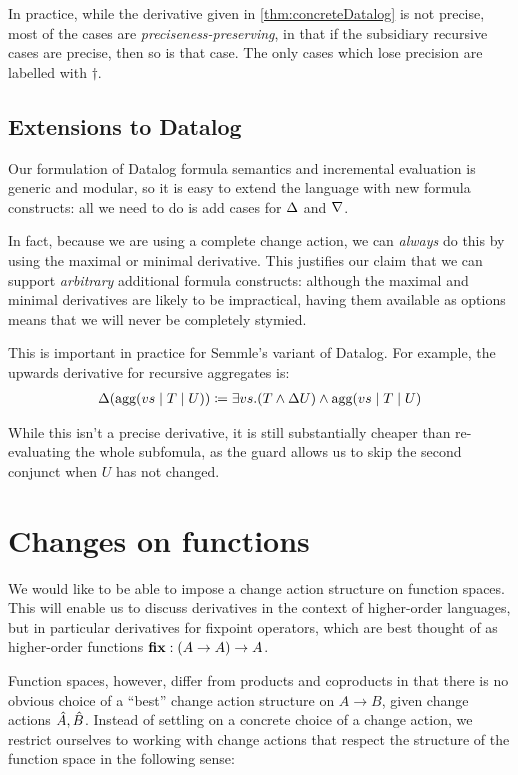 In practice, while the derivative given in \cref{thm:concreteDatalog} is not
precise, most of the cases are \emph{preciseness-preserving}, in that if the
subsidiary recursive cases are precise, then so is that case. The only cases
which lose precision are labelled with $\dagger$.

\subsection{Extensions to Datalog}
\label{sec:extensions}

Our formulation of Datalog formula semantics and incremental evaluation is 
generic and modular, so it is easy to extend the language with new
formula constructs: all we need to do is add cases for $\Delta$ and $\nabla$.

In fact, because we are using a complete change action, we can \emph{always} do this by using the maximal or
minimal derivative. This justifies our claim that we can support
\emph{arbitrary} additional formula constructs: although the maximal and minimal
derivatives are likely to be impractical, having them
available as options means that we will never be completely stymied.

This is important in practice for Semmle's variant of Datalog. For example, the
upwards derivative for recursive aggregates \autocite{demoor2013aggregates} is:
\begin{align*}
  \Delta(\textrm{agg}(vs \mid T \mid U)) \coloneqq \exists vs. (T \wedge \Delta{U}) \wedge \textrm{agg}(vs \mid T \mid U)
\end{align*}

While this isn't a precise derivative, it is still substantially cheaper than
re-evaluating the whole subfomula, as the guard allows us to skip the second conjunct when $U$
has not changed.

\section{Changes on functions}

We would like to be able to impose a change action structure on function spaces. This will enable us
to discuss derivatives in the context of higher-order languages, but in particular derivatives for
fixpoint operators, which are best thought of as higher-order functions 
$\mathbf{fix} : (A \rightarrow A) \rightarrow A$. 

Function spaces, however, differ from products and coproducts in that there is no obvious choice
of a ``best'' change action structure on $A \rightarrow B$, given change actions $\hat{A}, \hat{B}$.
Instead of settling on a concrete choice of a change action, we restrict ourselves to working
with change actions that respect the structure of the function space in the following sense:

